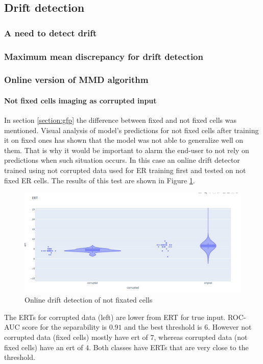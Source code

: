 \subsection{Drift detection}
    \subsubsection{A need to detect drift}
    \subsubsection{Maximum mean discrepancy for drift detection}
        
    \subsubsection{Online version of MMD algorithm}
            
            \paragraph{Not fixed cells imaging as corrupted input}
                In section \ref{section:gfp} the difference between fixed and not fixed cells was mentioned. Visual analysis of model's predictions for not fixed cells after training it on fixed ones has shown that the model was not able to generalize well on them. That is why it would be important to alarm the end-user to not rely on predictions when such situation occurs. In this case an online drift detector trained using not corrupted data used for ER training first and tested on not fixed ER cells. The results of this test are shown in Figure \ref{fig:online-drift-not-fixed}.
                \begin{figure}[H]
                    \begin{center}
                        \includegraphics[width=\linewidth]{bilder/drift-detection/online-fixed-vs-not-fixed.jpg}
                        \caption{Online drift detection of not fixated cells}\label{fig:online-drift-not-fixed}
                    \end{center}
                \end{figure}
                The ERTs for corrupted data (left) are lower from ERT for true input. ROC-AUC score for the separability is $0.91$ and the best threshold is $6$. However not corrupted data (fixed cells) mostly have ert of $7$, whereas corrupted data (not fixed cells) have an ert of $4$. Both classes have ERTs that are very close to the threshold.
